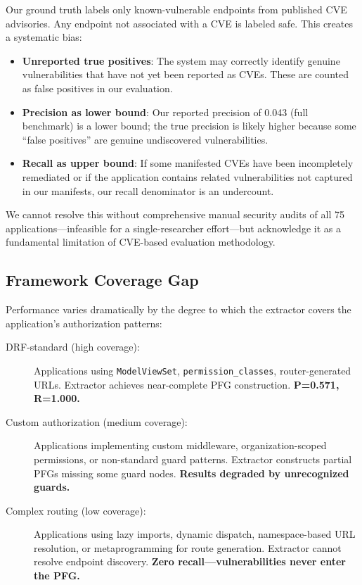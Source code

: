 Our ground truth labels only known-vulnerable endpoints from published CVE advisories. Any endpoint not associated with a CVE is labeled safe. This creates a systematic bias:

\begin{itemize}
    \item \textbf{Unreported true positives}: The system may correctly identify genuine vulnerabilities that have not yet been reported as CVEs. These are counted as false positives in our evaluation.
    \item \textbf{Precision as lower bound}: Our reported precision of 0.043 (full benchmark) is a lower bound; the true precision is likely higher because some ``false positives'' are genuine undiscovered vulnerabilities.
    \item \textbf{Recall as upper bound}: If some manifested CVEs have been incompletely remediated or if the application contains related vulnerabilities not captured in our manifests, our recall denominator is an undercount.
\end{itemize}

We cannot resolve this without comprehensive manual security audits of all 75 applications—infeasible for a single-researcher effort—but acknowledge it as a fundamental limitation of CVE-based evaluation methodology.

\subsection{Framework Coverage Gap}

Performance varies dramatically by the degree to which the extractor covers the application's authorization patterns:

\begin{description}
    \item[DRF-standard (high coverage):] Applications using \texttt{ModelViewSet}, \texttt{permission\_classes}, router-generated URLs. Extractor achieves near-complete PFG construction. \textbf{P=0.571, R=1.000.}

    \item[Custom authorization (medium coverage):] Applications implementing custom middleware, organization-scoped permissions, or non-standard guard patterns. Extractor constructs partial PFGs missing some guard nodes. \textbf{Results degraded by unrecognized guards.}

    \item[Complex routing (low coverage):] Applications using lazy imports, dynamic dispatch, namespace-based URL resolution, or metaprogramming for route generation. Extractor cannot resolve endpoint discovery. \textbf{Zero recall—vulnerabilities never enter the PFG.}
\end{description}

